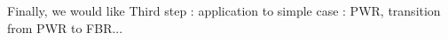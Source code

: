 \documentclass[dvips,12pt]{article}
\begin{document}
Finally, we would like
Third step : application to simple case : PWR, transition from PWR to FBR...

 












\end{document}
